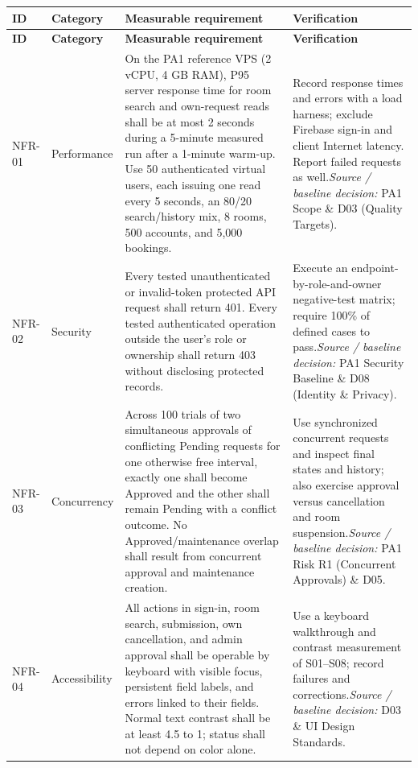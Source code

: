 \begingroup
\small
{}
\setlength{\tabcolsep}{3pt}
\renewcommand{\arraystretch}{1.1}
\begin{longtable}{|>{\raggedright\arraybackslash}p{}|>{\raggedright\arraybackslash}p{}|>{\raggedright\arraybackslash}p{}|>{\raggedright\arraybackslash}p{}|}
\hline
\textbf{ID} & \textbf{Category} & \textbf{Measurable requirement} & \textbf{Verification} \\ \hline
\endfirsthead
\hline
\textbf{ID} & \textbf{Category} & \textbf{Measurable requirement} & \textbf{Verification} \\ \hline
\endhead
\hline
\endfoot
\hline
\endlastfoot
NFR-01 & Performance & On the PA1 reference VPS (2 vCPU, 4 GB RAM), P95 server response time for room search and own-request reads shall be at most 2 seconds during a 5-minute measured run after a 1-minute warm-up. Use 50 authenticated virtual users, each issuing one read every 5 seconds, an 80/20 search/history mix, 8 rooms, 500 accounts, and 5,000 bookings. & Record response times and errors with a load harness; exclude Firebase sign-in and client Internet latency. Report failed requests as well.\newline\textit{Source / baseline decision:} PA1 Scope \& D03 (Quality Targets). \\ \hline
NFR-02 & Security & Every tested unauthenticated or invalid-token protected API request shall return 401. Every tested authenticated operation outside the user's role or ownership shall return 403 without disclosing protected records. & Execute an endpoint-by-role-and-owner negative-test matrix; require 100\% of defined cases to pass.\newline\textit{Source / baseline decision:} PA1 Security Baseline \& D08 (Identity \& Privacy). \\ \hline
NFR-03 & Concurrency & Across 100 trials of two simultaneous approvals of conflicting Pending requests for one otherwise free interval, exactly one shall become Approved and the other shall remain Pending with a conflict outcome. No Approved/maintenance overlap shall result from concurrent approval and maintenance creation. & Use synchronized concurrent requests and inspect final states and history; also exercise approval versus cancellation and room suspension.\newline\textit{Source / baseline decision:} PA1 Risk R1 (Concurrent Approvals) \& D05. \\ \hline
NFR-04 & Accessibility & All actions in sign-in, room search, submission, own cancellation, and admin approval shall be operable by keyboard with visible focus, persistent field labels, and errors linked to their fields. Normal text contrast shall be at least 4.5 to 1; status shall not depend on color alone. & Use a keyboard walkthrough and contrast measurement of S01--S08; record failures and corrections.\newline\textit{Source / baseline decision:} D03 \& UI Design Standards. \\ \hline

\end{longtable}
